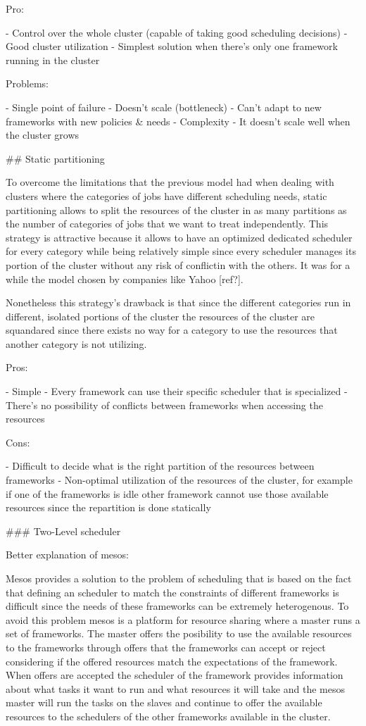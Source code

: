 Pro:

- Control over the whole cluster (capable of taking good scheduling decisions)
- Good cluster utilization
- Simplest solution when there's only one framework running in the cluster

Problems:

- Single point of failure
- Doesn't scale (bottleneck)
- Can't adapt to new frameworks with new policies & needs
- Complexity
- It doesn't scale well when the cluster grows

## Static partitioning

To overcome the limitations that the previous model had when dealing
with clusters where the categories of jobs have different scheduling
needs, static partitioning allows to split the resources of the cluster
in as many partitions as the number of categories of jobs that we want to
treat independently. This strategy is attractive because it allows to
have an optimized dedicated scheduler for every category while being
relatively simple since every scheduler manages its portion of the
cluster without any risk of conflictin with the others. It was
for a while the model chosen by companies like Yahoo [ref?].

Nonetheless this strategy's drawback is that since the different 
categories run in different, isolated portions of the cluster the
resources of the cluster are squandared since there exists no way for
a category to use the resources that another category is not utilizing.

Pros:

- Simple
- Every framework can use their specific scheduler that is specialized
- There's no possibility of conflicts between frameworks when
  accessing the resources

Cons:

- Difficult to decide what is the right partition of the resources
between frameworks
- Non-optimal utilization of the resources of the cluster, for example
if one of the frameworks is idle other framework cannot use those
available resources since the repartition is done statically

### Two-Level scheduler

Better explanation of mesos:

Mesos provides a solution to the problem of scheduling that is based
on the fact that defining an scheduler to match the constraints of different
frameworks is difficult since the needs of these frameworks can be
extremely heterogenous. To avoid this problem mesos is a platform for
resource sharing where a master runs a set of frameworks. The master
offers the posibility to use the available resources to the frameworks
through offers that the frameworks can accept or reject considering if
the offered resources match the expectations of the framework. When
offers are accepted the scheduler of the framework provides
information about what tasks it want to run and what resources it will
take and the mesos master will run the tasks on the slaves and
continue to offer the available resources to the schedulers of the
other frameworks available in the cluster.

